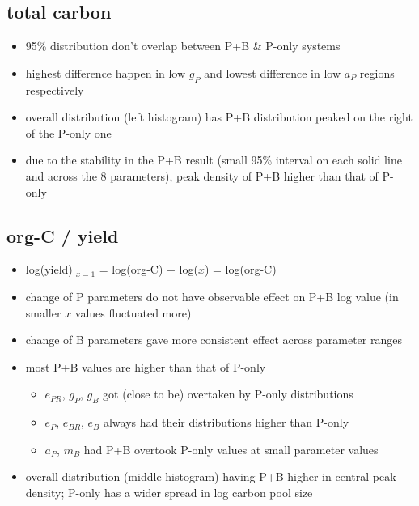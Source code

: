 \documentclass[../thesis.tex]{subfiles} %
\begin{document}
\subsection{total carbon}
\begin{itemize}
    \item 95\% distribution don't overlap between P+B \& P-only systems
    \item highest difference happen in low $g_P$ and lowest difference in low $a_P$ regions respectively
    \item overall distribution (left histogram) has P+B distribution peaked on the right of the P-only one
    \item due to the stability in the P+B result (small 95\% interval on each solid line and across the 8 parameters), peak density of P+B higher than that of P-only
\end{itemize}

\subsection{org-C / yield}
\begin{itemize}
    \item log(yield)|$_{x=1}$ = log(org-C) + log($x$) = log(org-C)
    \item change of P parameters do not have observable effect on P+B log value (in smaller $x$ values fluctuated more)
    \item change of B parameters gave more consistent effect across parameter ranges
    \item most P+B values are higher than that of P-only
    \begin{itemize}
        \item $e_{PR}$, $g_P$, $g_B$ got (close to be) overtaken by P-only distributions
        \item $e_P$, $e_{BR}$, $e_B$ always had their distributions higher than P-only
        \item $a_P$, $m_B$ had P+B overtook P-only values at small parameter values
    \end{itemize}
    \item overall distribution (middle histogram) having P+B higher in central peak density; P-only has a wider spread in log carbon pool size
\end{itemize}
\end{document}
